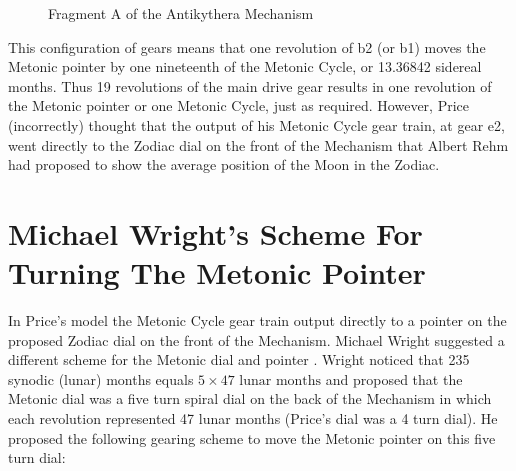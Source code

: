 \documentclass[11pt, oneside]{article}   	%
\theoremstyle{definition}
\begin{document}
\bigskip
\begin{figure}[H]
\caption{Fragment A of the Antikythera Mechanism \cite{wiki:fragmentA}}
\label{fig:fragmentA}
\end{figure}

\bigskip
\noindent
This configuration of gears means that one revolution of b2 (or b1) moves the Metonic pointer by one nineteenth of the Metonic Cycle, 
or 13.36842 sidereal months. Thus 19 revolutions of the main drive gear results in one revolution of the Metonic pointer or one Metonic Cycle, 
just as required. However, Price (incorrectly) thought that the output of his Metonic Cycle gear train, at gear e2,  went directly to the Zodiac dial 
on the front of the Mechanism that Albert Rehm \cite{wiki:rehm} had proposed to show the average position of the Moon in the Zodiac.

\section{Michael Wright's Scheme For Turning The Metonic Pointer}
In Price's model the Metonic Cycle gear train output directly to a pointer on the proposed Zodiac dial on the front of the Mechanism. Michael Wright suggested 
a different scheme for the Metonic dial and pointer \cite{Wright2005a}. Wright noticed that 235 synodic (lunar) months equals $5 \times 47 \text{ lunar months}$ 
and proposed that the Metonic dial was a five turn spiral dial on the back of the Mechanism in which each revolution represented 47 lunar months (Price's dial 
was a 4 turn dial). He proposed the following gearing scheme to move the Metonic pointer on this five turn dial:
\end{document}
